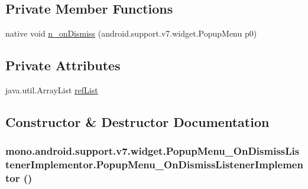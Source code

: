 \subsection*{Private Member Functions}
\begin{CompactItemize}
\item 
native void \hyperlink{classmono_1_1android_1_1support_1_1v7_1_1widget_1_1_popup_menu___on_dismiss_listener_implementor_b7e0baedbf8161a1ad376d4d9173b255}{n\_\-onDismiss} (android.support.v7.widget.PopupMenu p0)
\end{CompactItemize}
\subsection*{Private Attributes}
\begin{CompactItemize}
\item 
java.util.ArrayList \hyperlink{classmono_1_1android_1_1support_1_1v7_1_1widget_1_1_popup_menu___on_dismiss_listener_implementor_a8589501d990d4181a1ce3a3a26e4c5d}{refList}
\end{CompactItemize}


\subsection{Constructor \& Destructor Documentation}
\hypertarget{classmono_1_1android_1_1support_1_1v7_1_1widget_1_1_popup_menu___on_dismiss_listener_implementor_7f600ddc8c698038757a0b9837916ded}{
\subsubsection[{PopupMenu\_\-OnDismissListenerImplementor}]{\setlength{\rightskip}{0pt plus 5cm}mono.android.support.v7.widget.PopupMenu\_\-OnDismissListenerImplementor.PopupMenu\_\-OnDismissListenerImplementor ()}}
\label{classmono_1_1android_1_1support_1_1v7_1_1widget_1_1_popup_menu___on_dismiss_listener_implementor_7f600ddc8c698038757a0b9837916ded}





